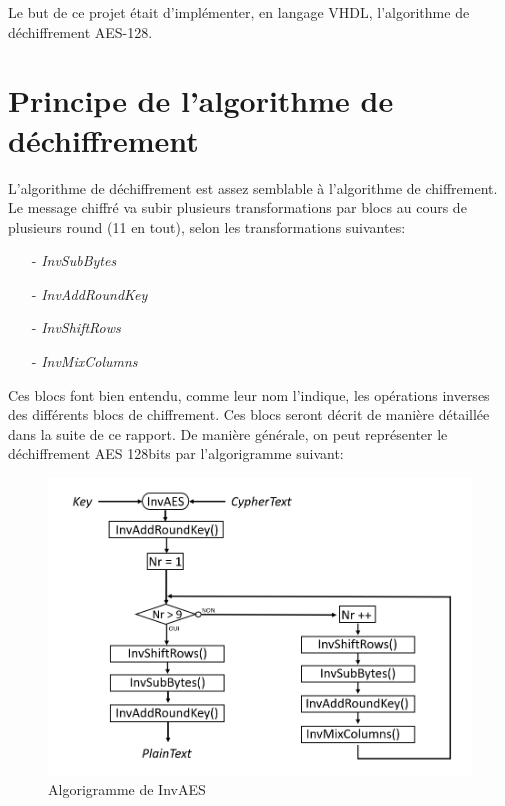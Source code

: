 \documentclass[a4paper, 12pt]{article}
\begin{document}
\par Le but de ce projet était d'implémenter, en langage VHDL, l'algorithme de déchiffrement AES-128. 
\section{Principe de l'algorithme de déchiffrement}
L'algorithme de déchiffrement est assez semblable à l'algorithme de chiffrement. Le message chiffré va subir plusieurs transformations par blocs au cours de plusieurs round (11 en tout), selon les transformations suivantes:
	\begin{itemize}
		\item[-] \emph{InvSubBytes}
		\item[-] \emph{InvAddRoundKey}
		\item[-] \emph{InvShiftRows}
		\item[-] \emph{InvMixColumns}
	\end{itemize}
Ces blocs font bien entendu, comme leur nom l'indique, les opérations inverses des différents blocs de chiffrement. Ces blocs seront décrit de manière détaillée dans la suite de ce rapport. 
\newpage
De manière générale, on peut représenter le déchiffrement AES 128bits par l'algorigramme suivant:
	\begin{figure}[h]
	\begin{center}
	\includegraphics[scale=0.5]{Images/InvAESAlgorigramme.png}
	\end{center}
	\caption{Algorigramme de InvAES}
	\label{InvAES algorigramme}
	\end{figure}
\end{document}
